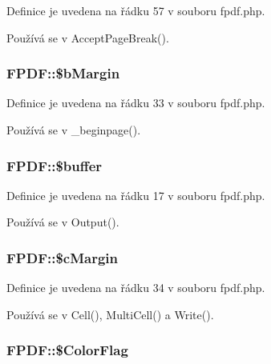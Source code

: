 Definice je uvedena na řádku 57 v souboru fpdf.\-php.



Používá se v Accept\-Page\-Break().

\hypertarget{class_f_p_d_f_a45f713138b48185ffb8d6952158275b6}{
\subsubsection[{\$b\-Margin}]{\setlength{\rightskip}{0pt plus 5cm}F\-P\-D\-F\-::\$b\-Margin}}\label{class_f_p_d_f_a45f713138b48185ffb8d6952158275b6}


Definice je uvedena na řádku 33 v souboru fpdf.\-php.



Používá se v \-\_\-beginpage().

\hypertarget{class_f_p_d_f_aa5e639d922350949dc1a58a4597c58bb}{
\subsubsection[{\$buffer}]{\setlength{\rightskip}{0pt plus 5cm}F\-P\-D\-F\-::\$buffer}}\label{class_f_p_d_f_aa5e639d922350949dc1a58a4597c58bb}


Definice je uvedena na řádku 17 v souboru fpdf.\-php.



Používá se v Output().

\hypertarget{class_f_p_d_f_af17b206c29beaba34856e916a2baf227}{
\subsubsection[{\$c\-Margin}]{\setlength{\rightskip}{0pt plus 5cm}F\-P\-D\-F\-::\$c\-Margin}}\label{class_f_p_d_f_af17b206c29beaba34856e916a2baf227}


Definice je uvedena na řádku 34 v souboru fpdf.\-php.



Používá se v Cell(), Multi\-Cell() a Write().

\hypertarget{class_f_p_d_f_ae9a2ff1c3ff43210435b4276e579498a}{
\subsubsection[{\$\-Color\-Flag}]{\setlength{\rightskip}{0pt plus 5cm}F\-P\-D\-F\-::\$\-Color\-Flag}}\label{class_f_p_d_f_ae9a2ff1c3ff43210435b4276e579498a}



